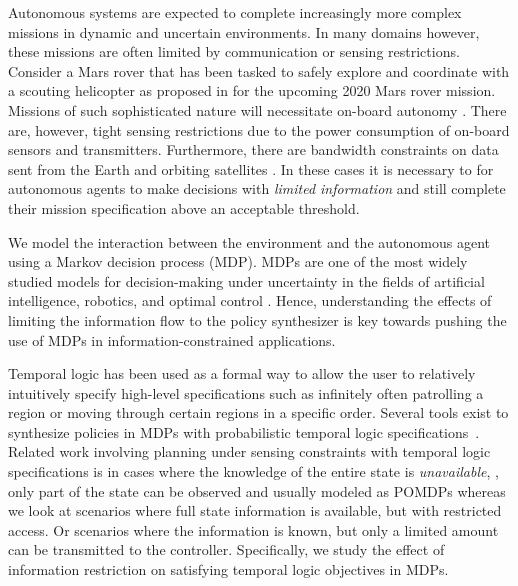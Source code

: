Autonomous systems are expected to complete increasingly more complex missions in dynamic and uncertain environments. In many domains however, these missions are often limited by communication or sensing restrictions. Consider a Mars rover that has been tasked to safely explore and coordinate with a scouting helicopter as proposed in \cite{landau2015helicopter} for the upcoming 2020 Mars rover mission. Missions of such sophisticated nature will necessitate on-board autonomy \cite{francis2017advanced,estlin2007increased}. There are, however, tight sensing restrictions due to the power consumption of on-board sensors and transmitters. Furthermore, there are bandwidth constraints on data sent from the Earth and orbiting satellites \cite{sherwood2014,Backes1999}. In these cases it is necessary to for autonomous agents to make decisions with \emph{limited information} and still complete their mission specification above an acceptable threshold. %

We model the interaction between the environment and the autonomous agent using a Markov decision process (MDP). MDPs are one of the most widely studied models for decision-making under uncertainty in the fields of artificial intelligence, robotics, and optimal control \cite{Papadimitriou87}. Hence, understanding the effects of limiting the information flow to the policy synthesizer is key towards pushing the use of MDPs in information-constrained applications. 


Temporal logic has been used as a formal way to allow the user to relatively intuitively specify high-level specifications such as infinitely often patrolling a region or moving through certain regions in a specific order. %
Several tools exist to synthesize policies in MDPs with probabilistic temporal logic specifications~\cite{Svoreňová13,Fu15}. %
Related work involving planning under sensing constraints with temporal logic specifications is in cases where the knowledge of the entire state is \emph{unavailable}, \ie, only part of the state can be observed and usually modeled as POMDPs whereas we look at scenarios where full state information is available, but with restricted access. Or scenarios where the information is known, but only a limited amount can be transmitted to the controller. Specifically, we study the effect of information restriction on satisfying temporal logic objectives in MDPs.

